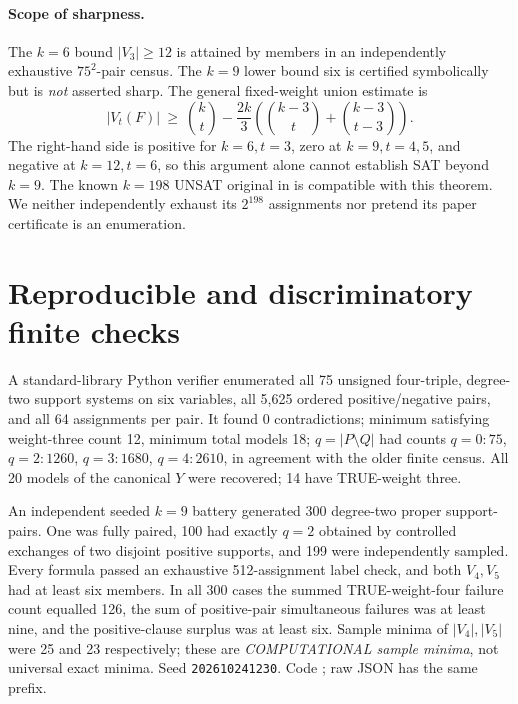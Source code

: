 \documentclass[11pt]{article}
\begin{document}
\paragraph{Scope of sharpness.}
The \(k=6\) bound \(|V_3|\ge12\) is attained by members in an independently exhaustive \(75^2\)-pair census. The \(k=9\) lower bound six is certified symbolically but is \emph{not} asserted sharp. The general fixed-weight union estimate is
\[
|V_t(F)|\ \ge\ \binom kt-\frac{2k}{3}
\left(\binom{k-3}{t}+\binom{k-3}{t-3}\right).
\]
The right-hand side is positive for \(k=6,t=3\), zero at \(k=9,t=4,5\), and negative at \(k=12,t=6\), so this argument alone cannot establish SAT beyond \(k=9\). The known \(k=198\) UNSAT original in \cite{docker} is compatible with this theorem. We neither independently exhaust its \(2^{198}\) assignments nor pretend its paper certificate is an enumeration.

\section{Reproducible and discriminatory finite checks}
A standard-library Python verifier enumerated all 75 unsigned four-triple, degree-two support systems on six variables, all 5,625 ordered positive/negative pairs, and all 64 assignments per pair. It found 0 contradictions; minimum satisfying weight-three count 12, minimum total models 18; \(q=|P\setminus Q|\) had counts \(q=0:75\), \(q=2:1260\), \(q=3:1680\), \(q=4:2610\), in agreement with the older finite census. All 20 models of the canonical \(Y\) were recovered; 14 have TRUE-weight three.

An independent seeded \(k=9\) battery generated 300 degree-two proper support-pairs. One was fully paired, 100 had exactly \(q=2\) obtained by controlled exchanges of two disjoint positive supports, and 199 were independently sampled. Every formula passed an exhaustive 512-assignment label check, and both \(V_4,V_5\) had at least six members. In all 300 cases the summed TRUE-weight-four failure count equalled 126, the sum of positive-pair simultaneous failures was at least nine, and the positive-clause surplus was at least six. Sample minima of \(|V_4|,|V_5|\) were 25 and 23 respectively; these are \emph{COMPUTATIONAL sample minima}, not universal exact minima. Seed \texttt{202610241230}. Code ; raw JSON has the same prefix.
\end{document}
